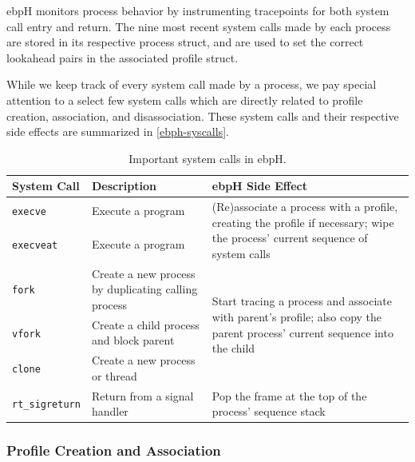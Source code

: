 \documentclass[
  12pt]{findlay}
\begin{document}
ebpH monitors process behavior by instrumenting tracepoints for both
system call entry and return. The nine most recent system calls made by
each process are stored in its respective process struct, and are used
to set the correct lookahead pairs in the associated profile struct.

While we keep track of every system call made by a process, we pay
special attention to a select few system calls which are directly
related to profile creation, association, and disassociation. These
system calls and their respective side effects are summarized in
\autoref{ebph-syscalls}.

\begin{table}
\caption{Important system calls in ebpH.}
\label{ebph-syscalls}
\begin{center}
\begin{tabular}{|l|p{2.4in}|p{2.6in}|}
\hline
\textbf{System Call} & \textbf{Description} & \textbf{ebpH Side Effect}\\
\hline
\hline
\texttt{execve} & Execute a program & \multirow{4}{2.6in}{(Re)associate a process with a profile, creating the profile if necessary;
wipe the process' current sequence of system calls}\\
&&\\
\cline{1-2}
\texttt{execveat} & Execute a program & \\
&&\\
\hline
\texttt{fork} & Create a new process by duplicating calling process & \multirow{3}{2.6in}{Start tracing a process and associate with parent's profile; also copy the parent process' current sequence into the child}\\
\cline{1-2}
\texttt{vfork} & Create a child process and block parent &\\
\cline{1-2}
\texttt{clone} & Create a new process or thread &\\
\hline
\texttt{rt\_sigreturn} & Return from a signal handler & Pop the frame at the top of the process' sequence stack\\
\hline
\end{tabular}
\end{center}
\end{table}

\hypertarget{profile-creation-and-association}{%
\subsubsection{Profile Creation and
Association}\label{profile-creation-and-association}}
\end{document}
